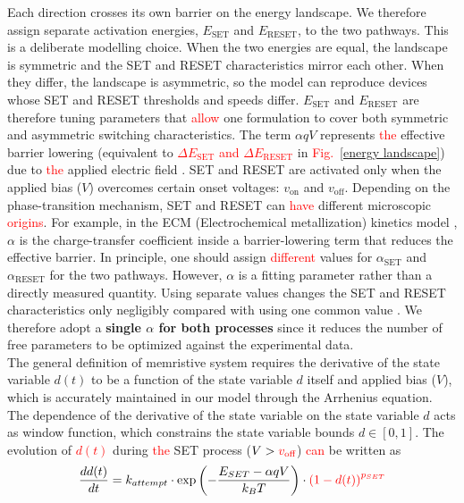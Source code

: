 \documentclass[aip,apl,reprint,floatfix]{revtex4-2}
\newcommand{\changed}[1]{\textcolor{red}{#1}}
\begin{document}
Each direction crosses its own barrier on the energy landscape. We therefore assign separate activation energies, $E_{\text{SET}}$ and $E_{\text{RESET}}$, to the two pathways. This is a deliberate modelling choice. When the two energies are equal, the landscape is symmetric and the SET and RESET characteristics mirror each other. When they differ, the landscape is asymmetric, so the model can reproduce devices whose SET and RESET thresholds and speeds differ. $E_{\text{SET}}$ and $E_{\text{RESET}}$ are therefore tuning parameters that \changed{allow} one formulation to cover both symmetric and asymmetric switching characteristics.
 The term $\alpha qV$ represents \changed{the} effective barrier lowering (equivalent to \changed{$\Delta E_{\text{SET}}$ and $\Delta E_{\text{RESET}}$} in \changed{Fig.~}\ref{energy landscape}) due to \changed{the} applied electric field \cite{Russo,Ielmini}. SET and RESET are activated only when the applied bias ($V$) overcomes certain onset voltages: $v_{\text{on}}$ and $v_{\text{off}}$. Depending on the phase-transition mechanism, SET and RESET can \changed{have} different microscopic \changed{origins}. For example, in the ECM (Electrochemical metallization)  kinetics model \cite{Menzel}, $\alpha$ is the charge-transfer coefficient inside a barrier-lowering term that reduces the effective barrier. In principle, one should assign \changed{different} values for $\alpha_{\text{SET}}$ and $\alpha_{\text{RESET}}$ for the two pathways. However, $\alpha$ is a fitting parameter rather than a directly measured quantity. Using separate values changes the SET and RESET characteristics only negligibly compared with using one common value \cite{Ielmini}. We therefore adopt a \textbf{single $\alpha$ for both processes} since it reduces the number of free parameters to be optimized against the experimental data.
\\The general definition of memristive system requires the derivative of the state variable $d(t)$ to be a function of the state variable $d$ itself and applied bias ($V$), which is accurately maintained in our model through the Arrhenius equation. The dependence of the derivative of the state variable on the state variable $d$ acts as window function, which constrains the state variable bounds $d \in [0,1]$.
The evolution of \changed{$d(t)$} during \changed{the} SET process ($V > \changed{v_{\text{off}}}$) \changed{can} be written as
\begin{equation}
    \frac{dd(t)}{dt} = k_{attempt} \cdot \exp\left( -\frac{E_{SET} - \alpha qV}{k_B T} \right) \cdot \changed{\left(1 - d(t)\right)^{p_{SET}}}
    \label{eq:set}
\end{equation}
\end{document}
